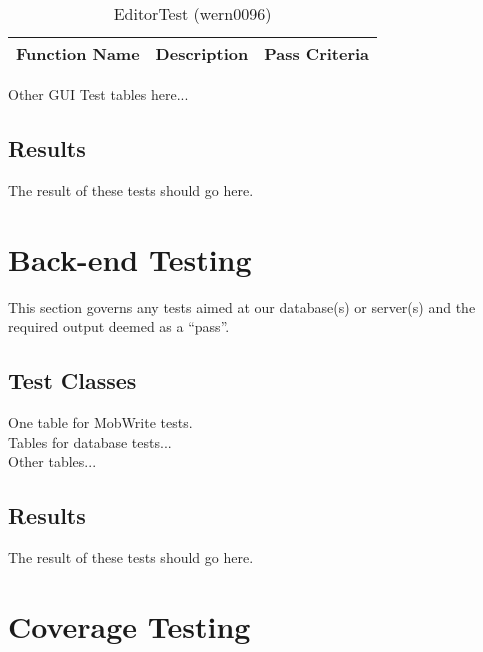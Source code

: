 \documentclass[14pt, a4paper]{article}
\begin{document}
\begin{table}[h]
	\centering	
	\caption{EditorTest (wern0096)}
	\begin{tabular}{|p{4cm}|p{5cm}|p{6cm}|} 
		\hline
		\textbf{Function Name} & \textbf{Description} & \textbf{Pass Criteria}  \\\hline
	\end{tabular}
\end{table}

Other GUI Test tables here...\\



\newpage
\subsection{Results}

The result of these tests should go here.


\newpage
\section{Back-end Testing}

This section governs any tests aimed at our database(s) or server(s) and the required output deemed as a ``pass''. \\

\subsection{Test Classes}

One table for MobWrite tests. \\

Tables for database tests...\\

Other tables...\\

\newpage

\subsection{Results}

The result of these tests should go here.

\newpage

\section{Coverage Testing}
\end{document}
